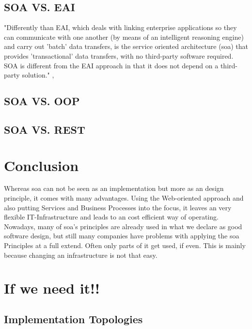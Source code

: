 \documentclass[12pt]{article}
\begin{document}
\subsection{SOA VS. EAI}
"Differently than EAI, which deals with linking enterprise applications so they can communicate with one another (by means of an intelligent reasoning engine) and carry out 'batch' data transfers, is the service oriented architecture (\gls{soa}) that provides 'transactional' data transfers, with no third-party software required. SOA is different from the EAI approach in that it does not depend on a third-party solution." ,\cite{soadef}
\begin{figure}[here!]
	\centering
	\label{fig:eaipartofso}
	\end{figure}
\subsection{SOA VS. OOP}
\subsection{SOA VS. REST}



\section{Conclusion}
Whereas \gls{soa} can not be seen as an implementation but more as an design principle, it comes with many advantages. Using the Web-oriented approach and also putting Services and Business Processes into the focus, it leaves an very flexible IT-Infrastructure and leads to an cost efficient way of operating.\\
Nowadays, many of \gls{soa}'s principles are already used in what we declare as good software design, but still many companies have problems with applying the \gls{soa} Principles at a full extend. Often only parts of it get used, if even. This is mainly because changing an infrastructure is not that easy. \\


\section{If we need it!!}

\subsection{Implementation Topologies}
\end{document}

